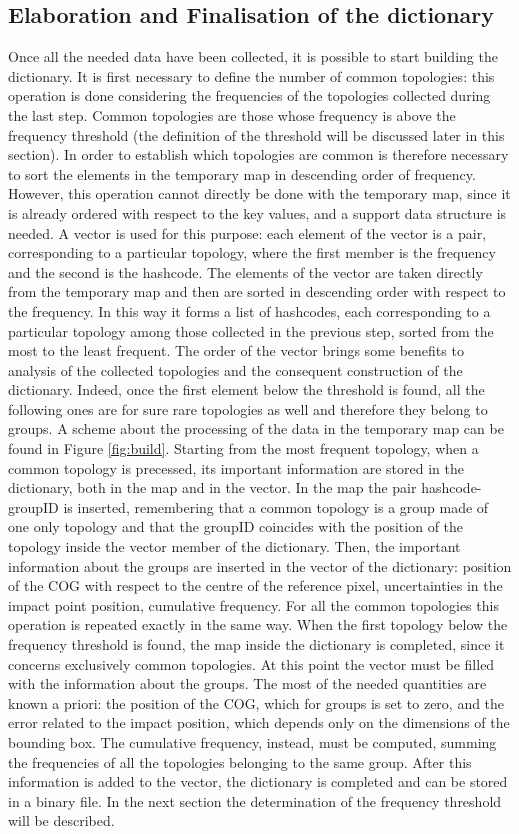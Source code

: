 \subsection{Elaboration and Finalisation of the dictionary}
Once all the needed data have been collected, it is possible to start building the dictionary. It is first necessary to define the number of common topologies: this operation is done considering the frequencies of the topologies collected during the last step. Common topologies are those whose frequency is above the frequency threshold (the definition of the threshold will be discussed later in this section). In order to establish which topologies are common is therefore necessary to sort the elements in the temporary map in descending order of frequency. However, this operation cannot directly be done with the temporary map, since it is already ordered with respect to the key values, and a support data structure is needed. A vector is used for this purpose: each element of the vector is a pair, corresponding to a particular topology, where the first member is the frequency and the second is the hashcode. The elements of the vector are taken directly from the temporary map and then are sorted in descending order with respect to the frequency. In this way it forms a list of hashcodes, each corresponding to a particular topology among those collected in the previous step, sorted from the most to the least frequent. The order of the vector brings some benefits to analysis of the collected topologies and the consequent construction of the dictionary. Indeed, once the first element below the threshold is found, all the following ones are for sure rare topologies as well and therefore they belong to groups. A scheme about the processing of the data in the temporary map can be found in Figure \ref{fig:build}.
Starting from the most frequent topology, when a common topology is precessed, its important information are stored in the dictionary, both in the map and in the vector. In the map the pair hashcode-groupID is inserted, remembering that a common topology is a group made of one only topology and that the groupID coincides with the position of the topology inside the vector member of the dictionary. Then, the important information about the groups are inserted in the vector of the dictionary: position of the COG with respect to the centre of the reference pixel, uncertainties in the impact point position, cumulative frequency. For all the common topologies this operation is repeated exactly in the same way. When the first topology below the frequency threshold is found, the map inside the dictionary is completed, since it concerns exclusively common topologies. At this point the vector must be filled with the information about the groups. The most of the needed quantities are known a priori: the position of the COG, which for groups is set to zero, and the error related to the impact position, which depends only on the dimensions of the bounding box. The cumulative frequency, instead, must be computed, summing the frequencies of all the topologies belonging to the same group. After this information is added to the vector, the dictionary is completed and can be stored in a binary file. In the next section the determination of the frequency threshold will be described.
